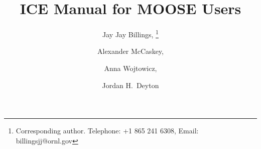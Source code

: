 \documentclass{report}
\begin{document}
\begin{titlepage}

\title{ICE Manual for MOOSE Users} 
\author[a,b]{Jay Jay Billings, \thanks{Corresponding author.
Telephone:
+1 865 241 6308, Email: billingsjj@ornl.gov}} %
\author[a]{Alexander McCaskey, }
\author[a]{Anna Wojtowicz, }
\author[a]{Jordan H.\ Deyton}
\end{titlepage}
\maketitle


\tableofcontents









%
%
\end{document}

